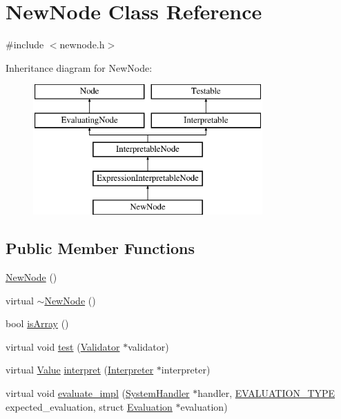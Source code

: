 \hypertarget{classNewNode}{}\section{New\+Node Class Reference}
\label{classNewNode}


{\ttfamily \#include $<$newnode.\+h$>$}

Inheritance diagram for New\+Node\+:\begin{figure}[H]
\begin{center}
\leavevmode
\includegraphics[height=5.000000cm]{classNewNode}
\end{center}
\end{figure}
\subsection*{Public Member Functions}
\begin{DoxyCompactItemize}
\item 
\hyperlink{classNewNode_a55edf2127f3cd875164a199029d7ebba}{New\+Node} ()
\item 
virtual \hyperlink{classNewNode_ab06c72bb48fc65bb12a21c1a6c3aa9c8}{$\sim$\+New\+Node} ()
\item 
bool \hyperlink{classNewNode_af2d1614a80b8fcc00957155109e4b2f2}{is\+Array} ()
\item 
virtual void \hyperlink{classNewNode_a9be504d069e8a5d4ea13b4767a3c792a}{test} (\hyperlink{classValidator}{Validator} $\ast$validator)
\item 
virtual \hyperlink{classValue}{Value} \hyperlink{classNewNode_a77447b9402f0153401bf0e623b5f1e6e}{interpret} (\hyperlink{classInterpreter}{Interpreter} $\ast$interpreter)
\item 
virtual void \hyperlink{classNewNode_a53fe843af3bbb2add900646ef3891f8e}{evaluate\+\_\+impl} (\hyperlink{classSystemHandler}{System\+Handler} $\ast$handler, \hyperlink{statics_8h_a6664c451ca7787483a7981cc1de68dbb}{E\+V\+A\+L\+U\+A\+T\+I\+O\+N\+\_\+\+T\+Y\+PE} expected\+\_\+evaluation, struct \hyperlink{structEvaluation}{Evaluation} $\ast$evaluation)
\end{DoxyCompactItemize}
